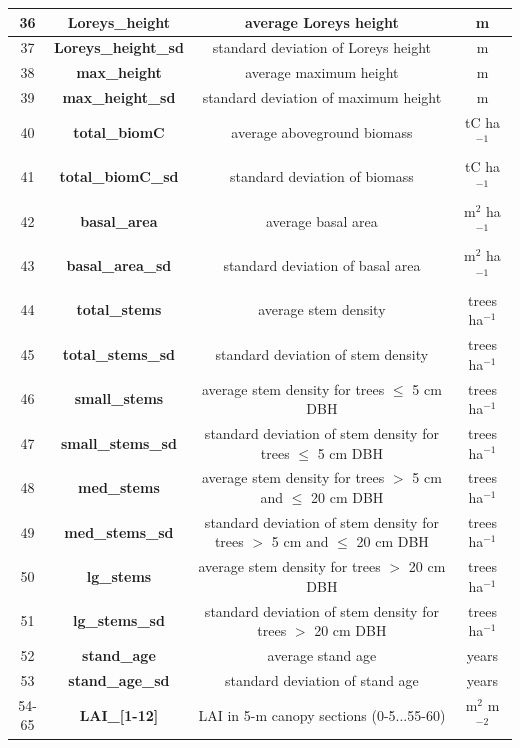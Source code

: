 \documentclass[a4paper, 12pt] {article}
\begin{document}
\begin{table} [H]
{\begin{tabular}{|c|c|c|c|}
\hline 
36 & \textbf{Loreys\_height} & average Loreys height  & m \\
\hline 
37 & \textbf{Loreys\_height\_sd} & standard deviation of Loreys height  & m \\
\hline 
38 & \textbf{max\_height} & average maximum height  & m \\
\hline 
39 & \textbf{max\_height\_sd} &  standard deviation of maximum height  & m \\
\hline 
40 & \textbf{total\_biomC} & average aboveground biomass & tC ha$^{-1}$ \\
\hline 
41 & \textbf{total\_biomC\_sd} &  standard deviation of biomass & tC ha$^{-1}$ \\
\hline 
42 & \textbf{basal\_area} & average basal area & m$^2$ ha$^{-1}$ \\
\hline 
43 & \textbf{basal\_area\_sd} & standard deviation of basal area & m$^2$ ha$^{-1}$ \\
\hline
44 & \textbf{total\_stems} & average stem density & trees ha$^{-1}$ \\
\hline 
45 & \textbf{total\_stems\_sd} & standard deviation of stem density & trees ha$^{-1}$ \\
\hline
46 & \textbf{small\_stems} & average stem density for trees $\leq$ 5 cm DBH & trees ha$^{-1}$ \\
\hline 
47 & \textbf{small\_stems\_sd} & standard deviation of stem density for trees $\leq$ 5 cm DBH & trees ha$^{-1}$ \\
\hline
48 & \textbf{med\_stems} & average stem density for trees $>$ 5 cm and $\leq$ 20 cm DBH & trees ha$^{-1}$ \\
\hline 
49 & \textbf{med\_stems\_sd} & standard deviation of stem density for trees $>$ 5 cm and $\leq$ 20 cm DBH & trees ha$^{-1}$ \\
\hline
50 & \textbf{lg\_stems} & average stem density for trees $>$ 20 cm DBH & trees ha$^{-1}$ \\
\hline 
51 & \textbf{lg\_stems\_sd} & standard deviation of stem density for trees $>$ 20 cm DBH & trees ha$^{-1}$ \\
\hline
52 & \textbf{stand\_age} &  average stand age & years \\
\hline 
53 & \textbf{stand\_age\_sd} &  standard deviation of stand age & years \\
\hline
54-65 & \textbf{LAI\_[1-12]} &  LAI in 5-m canopy sections (0-5...55-60) & m$^2$ m$^{-2}$ \\
\hline
\end{tabular}}
\end{table}
\end{document}
